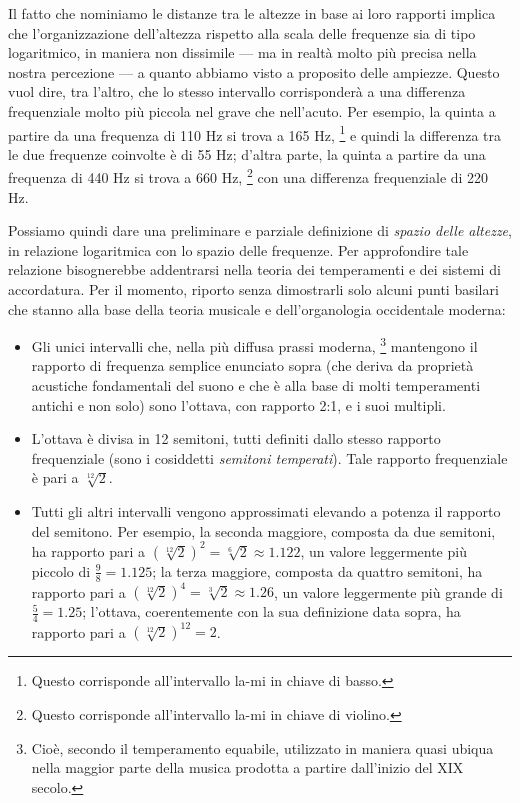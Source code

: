 Il fatto che nominiamo le distanze tra le altezze in base ai loro rapporti implica che l'organizzazione dell'altezza rispetto alla scala delle frequenze sia di tipo logaritmico, in maniera non dissimile --- ma in realtà molto più precisa nella nostra percezione --- a quanto abbiamo visto a proposito delle ampiezze. Questo vuol dire, tra l'altro, che lo stesso intervallo corrisponderà a una differenza frequenziale molto più piccola nel grave che nell'acuto. Per esempio, la quinta a partire da una frequenza di 110 Hz si trova a 165 Hz,%
\footnote{Questo corrisponde all'intervallo la-mi in chiave di basso.}
e quindi la differenza tra le due frequenze coinvolte è di 55 Hz; d'altra parte, la quinta a partire da una frequenza di 440 Hz si trova a 660 Hz,
\footnote{Questo corrisponde all'intervallo la-mi in chiave di violino.}
con una differenza frequenziale di 220 Hz.

Possiamo quindi dare una preliminare e parziale definizione di \emph{spazio delle altezze}, in relazione logaritmica con lo spazio delle frequenze. Per approfondire tale relazione bisognerebbe addentrarsi nella teoria dei temperamenti e dei sistemi di accordatura. Per il momento, riporto senza dimostrarli solo alcuni punti basilari che stanno alla base della teoria musicale e dell'organologia occidentale moderna:

\begin{itemize}

\item Gli unici intervalli che, nella più diffusa prassi moderna,%
\footnote {Cioè, secondo il temperamento equabile, utilizzato in maniera quasi ubiqua nella maggior parte della musica prodotta a partire dall'inizio del XIX secolo.}
mantengono il rapporto di frequenza semplice enunciato sopra (che deriva da proprietà acustiche fondamentali del suono e che è alla base di molti temperamenti antichi e non solo) sono l'ottava, con rapporto 2:1, e i suoi multipli.

\item L'ottava è divisa in 12 semitoni, tutti definiti dallo stesso rapporto frequenziale (sono i cosiddetti \emph{semitoni temperati}). Tale rapporto frequenziale è pari a $\sqrt[12]{2}$.

\item Tutti gli altri intervalli vengono approssimati elevando a potenza il rapporto del semitono. Per esempio, la seconda maggiore, composta da due semitoni, ha rapporto pari a $(\sqrt[12]{2})^2 = \sqrt[6]{2} \approx 1.122$, un valore leggermente più piccolo di $\frac{9}{8} = 1.125$; la terza maggiore, composta da quattro semitoni, ha rapporto pari a $(\sqrt[12]{2})^4 = \sqrt[3]{2} \approx 1.26$, un valore leggermente più grande di $\frac{5}{4} = 1.25$; l'ottava, coerentemente con la sua definizione data sopra, ha rapporto pari a $(\sqrt[12]{2})^{12} = 2$.

\end{itemize}




